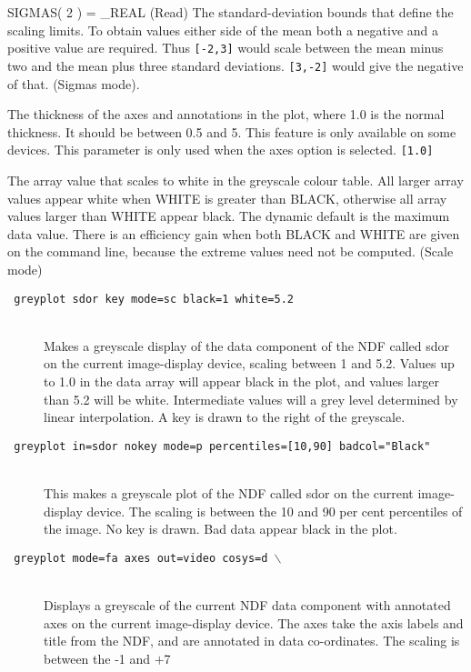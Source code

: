 \documentclass[twoside,11pt]{article}
\newcommand{\htmlref}[2]{#1}
\newcommand{\sstexamples}[1]{
   \goodbreak
   \item[Examples:] \mbox{} \\
   \vspace{-3.5ex}
   \begin{description}
      #1
   \end{description}
}
\newcommand{\sstsubsection}[1]{ \item[{#1}] \mbox{} \\}
\newcommand{\sstexamplesubsection}[2]{\sloppy \item{\ssttt #1} \mbox{} \\ #2 }
\newcommand{\ssttt}{\tt}
\renewcommand{\sstexamples}[1]{
      \htmlref{\item[Examples:]}{ap:example}
      \begin{description}
         #1
      \end{description}
   }
\renewcommand{\sstsubsection}[1]{\item[{#1}]}
\renewcommand{\sstexamplesubsection}[2]{\item[{\ssttt #1}] \\ #2}
\begin{document}
{{{         SIGMAS( 2 ) = \_REAL (Read)
      }{
         The standard-deviation bounds that define the scaling limits.
         To obtain values either side of the mean both a negative and
         a positive value are required.  Thus {\tt [-2,3]} would scale
         between the mean minus two and the mean plus three standard
         deviations.  {\tt [3,-2]} would give the negative of that. (Sigmas
         mode).
      }
      \sstsubsection{
         THICK = \_REAL (Read)
      }{
         The thickness of the axes and annotations in the plot, where
         1.0 is the normal thickness.  It should be between 0.5 and 5.
         This feature is only available on some devices.   This
         parameter is only used when the axes option is selected. {\tt [1.0]}
      }
      \sstsubsection{
         WHITE = \_DOUBLE (Read)
      }{
         The array value that scales to white in the greyscale
         colour table.  All larger array values appear white when
         WHITE is greater than BLACK, otherwise all array values
         larger than WHITE appear black.  The dynamic default is the
         maximum data value.   There is an efficiency gain when both
         BLACK and WHITE are given on the command line, because the
         extreme values need not be computed.  (Scale mode)
      }
   }
   \sstexamples{
      \sstexamplesubsection{
         greyplot sdor key mode=sc black=1 white=5.2
      }{
         Makes a greyscale display of the data component of the NDF
         called sdor on the current image-display device, scaling
         between 1 and 5.2.  Values up to 1.0 in the data array will
         appear black in the plot, and values larger than 5.2 will be
         white.  Intermediate values will a grey level determined by
         linear interpolation.  A key is drawn to the right of the
         greyscale.
      }
      \sstexamplesubsection{
         greyplot in=sdor nokey mode=p percentiles=[10,90] badcol={\tt "}Black{\tt "}
      }{
         This makes a greyscale plot of the NDF called sdor on the
         current image-display device. The scaling is between the 10 and
         90 per cent percentiles of the image.  No key is drawn.  Bad
         data appear black in the plot.
      }
      \sstexamplesubsection{
         greyplot mode=fa axes out=video cosys=d $\backslash$
      }{
         Displays a greyscale of the current NDF data component with
         annotated axes on the current image-display device.  The axes
         take the axis labels and title from the NDF, and are annotated
         in data co-ordinates.  The scaling is between the -1 and $+$7
}}}
\end{document}
